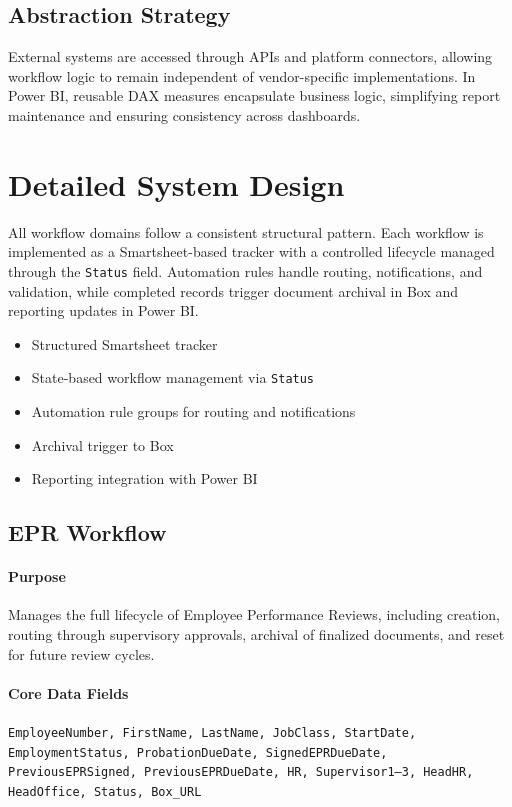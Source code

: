 \documentclass[12pt]{article}
\begin{document}
\subsection{Abstraction Strategy}

External systems are accessed through APIs and platform connectors, allowing workflow logic to remain independent of vendor-specific implementations. In Power BI, reusable DAX measures encapsulate business logic, simplifying report maintenance and ensuring consistency across dashboards.

\section{Detailed System Design}

All workflow domains follow a consistent structural pattern. Each workflow is implemented as a Smartsheet-based tracker with a controlled lifecycle managed through the \texttt{Status} field. Automation rules handle routing, notifications, and validation, while completed records trigger document archival in Box and reporting updates in Power BI.

\begin{itemize}[nosep]
    \item Structured Smartsheet tracker
    \item State-based workflow management via \texttt{Status}
    \item Automation rule groups for routing and notifications
    \item Archival trigger to Box
    \item Reporting integration with Power BI
\end{itemize}

\subsection{EPR Workflow}

\paragraph{Purpose}
Manages the full lifecycle of Employee Performance Reviews, including creation, routing through supervisory approvals, archival of finalized documents, and reset for future review cycles.

\paragraph{Core Data Fields}
\texttt{EmployeeNumber, FirstName, LastName, JobClass, StartDate, EmploymentStatus, ProbationDueDate, SignedEPRDueDate, PreviousEPRSigned, PreviousEPRDueDate, HR, Supervisor1--3, HeadHR, HeadOffice, Status, Box\_URL}
\end{document}
